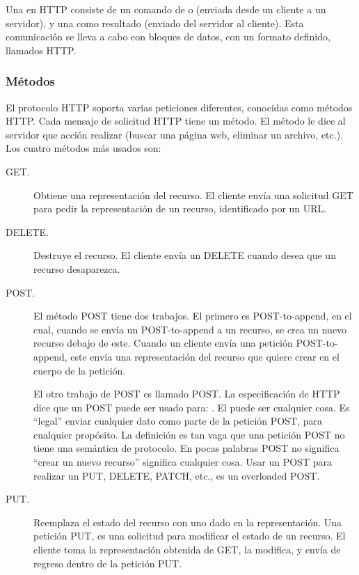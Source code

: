 Una  en HTTP consiste de un comando de  o  (enviada
desde un cliente a un servidor), y una  como resultado (enviado
del servidor al cliente). Esta comunicación se lleva a cabo con bloques
de datos, con un formato definido, llamados  HTTP.


\subsubsection{Métodos}
\label{\detokenize{chapter_one/rest:metodos}}
El protocolo HTTP soporta varias peticiones diferentes,
conocidas como métodos HTTP. Cada mensaje de solicitud HTTP tiene un
método. El método le dice al servidor que acción realizar (buscar una
página web, eliminar un archivo, etc.). Los cuatro métodos más usados
son:
\begin{description}
\item[{GET.}] \leavevmode
Obtiene una representación del recurso. El cliente envía una
solicitud GET para pedir la representación de un recurso,
identificado por un URL.

\item[{DELETE.}] \leavevmode
Destruye el recurso. El cliente envía un DELETE cuando desea que un
recurso desaparezca.

\item[{POST.}] \leavevmode
El método POST tiene dos trabajos. El primero es POST-to-append, en
el cual, cuando se envía un POST-to-append a un recurso, se crea un
nuevo recurso debajo de este. Cuando un cliente envía una petición
POST-to-append, este envía una representación del recurso que quiere
crear en el cuerpo de la petición.

El otro trabajo de POST es llamado  POST. La
especificación de HTTP dice que un POST puede ser usado para:
. El  puede ser cualquier cosa. Es “legal” enviar
cualquier dato como parte de la petición POST, para cualquier
propósito. La definición es tan vaga que una petición POST no tiene
una semántica de protocolo. En pocas palabras POST no significa
“crear un nuevo recurso” significa cualquier cosa. Usar un POST para
realizar un PUT, DELETE, PATCH, etc., es un overloaded POST.

\item[{PUT.}] \leavevmode
Reemplaza el estado del recurso con uno dado en la representación.
Una petición PUT, es una solicitud para modificar el estado de un
recurso. El cliente toma la representación obtenida de GET, la
modifica, y envía de regreso dentro de la petición PUT.

\end{description}

